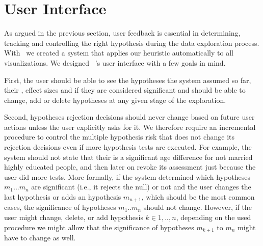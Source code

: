 \section{User Interface}
\label{sec:ui}

As argued in the previous section, user feedback is essential in determining, tracking and controlling the right hypothesis during the data exploration process.
With \system~we created a system that applies our heuristic automatically to all visualizations. We designed \system~'s user interface with a few goals in mind.

First, the user should be able to see the hypotheses the system assumed so far, their \pvals, effect sizes and if they are considered significant and should be able to change, add or delete hypotheses at any given stage of the exploration. 

Second, hypotheses rejection decisions should never change based on future user actions unless the user explicitly asks for it. We therefore require an incremental procedure to control the multiple hypothesis risk that does not change its rejection decisions even if more hypothesis tests are executed.
For example, the system should not state that their is a significant age difference for not married highly educated people, and then later on revoke its assessment just because the user did more tests. 
More formally, if the system determined which hypotheses $m_1 ...  m_n$ are significant (i.e., it rejects the null) or not and the user changes the last hypothesis or adds an hypothesis $m_{n+1}$, which should be the most common cases, the significance of hypotheses $m_1..m_{n}$ should not change. 
However, if the user might change, delete, or add hypothesis $k \in {1,..,n}$, depending on the used procedure we might allow that the significance of hypotheses $m_{k+1}$ to $m_n$ might have to change as well.

